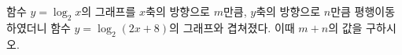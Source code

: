 함수 $y=\log_2 x$의 그래프를 $x$축의 방향으로 $m$만큼, $y$축의 방향으로 $n$만큼 평행이동하였더니 함수 $y=\log_2 (2x+8)$의 그래프와 겹쳐졌다. 이때 $m+n$의 값을 구하시오.
